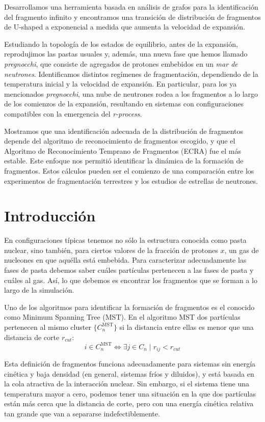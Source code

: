 Desarrollamos una herramienta basada en análisis de grafos para la identificación del fragmento infinito y encontramos una transición de distribución de fragmentos de U-shaped a exponencial a medida que aumenta la velocidad de expansión.

Estudiando la topología de los estados de equilibrio, antes de la expansión, reprodujimos las pastas usuales y, además, una nueva fase que hemos llamado \emph{pregnocchi}, que consiste de agregados de protones embebidos en un  \emph{mar de neutrones}.
Identificamos distintos regímenes de fragmentación, dependiendo de la temperatura inicial y la velocidad de expansión.
En particular, para los ya mencionados \emph{pregnocchi}, una nube de neutrones rodea a los fragmentos a lo largo de los comienzos de la expansión, resultando en sistemas con configuraciones compatibles con la emergencia del \emph{r-process}.

Mostramos que una identificación adecuada de la distribución de fragmentos depende del algoritmo de reconocimiento de fragmentos escogido, y que el Algoritmo de Reconocimiento Temprano de Fragmentos (ECRA) fue el más estable.
Este enfoque nos permitió identificar la dinámica de la formación de fragmentos.
Estos cálculos pueden ser el comienzo de una comparación entre los experimentos de fragmentación terrestres y los estudios de estrellas de neutrones.

\section{Introducción}
En configuraciones típicas tenemos no sólo la estructura conocida como pasta nuclear, sino también, para ciertos valores de la fracción de protones $x$, un gas de nucleones en que aquélla está embebida.
Para caracterizar adecuadamente las fases de pasta debemos saber cuáles partículas pertenecen a las fases de pasta y cuáles al gas.
Así, lo que debemos es encontrar los fragmentos que se forman a lo largo de la simulación.

Uno de los algoritmos para identificar la formación de fragmentos es el conocido como Minimum Spanning Tree (MST).
En el algoritmo MST dos partículas pertenecen al mismo cluster $\{C^{\text{MST}}_n\}$ si la distancia entre ellas es menor que una distancia de corte $r_{cut}$:
\begin{equation*}
  i \in C^{\text{MST}}_n \Leftrightarrow \exists j \in C_n \mid
  r_{ij} < r_{cut}
\end{equation*}

Esta definición de fragmentos funciona adecuadamente para sistemas sin energía cinética y baja densidad (en general, sistemas fríos y diluidos), y está basada en la cola atractiva de la interacción nuclear.
Sin embargo, si el sistema tiene una temperatura mayor a cero, podemos tener una situación en la que dos partículas están más cerca que la distancia de corte, pero con una energía cinética relativa tan grande que van a separarse indefectiblemente.

